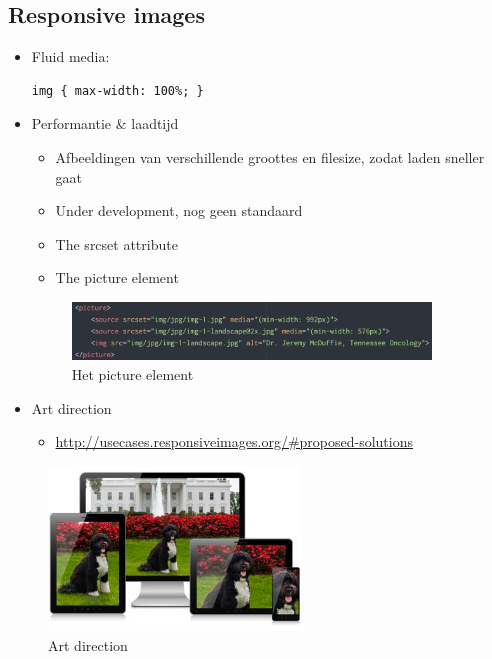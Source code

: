 \documentclass{article}
\begin{document}
\subsection{Responsive images}
\begin{itemize}
    \item Fluid media:
\begin{lstlisting}
img { max-width: 100%; }
\end{lstlisting}
    \item Performantie \& laadtijd
    \begin{itemize}
        \item Afbeeldingen van verschillende groottes en filesize, zodat laden sneller gaat 
        \item Under development, nog geen standaard
        \item The srcset attribute
        \item The picture element
    \end{itemize}
\begin{figure}[H]
    \centering
    \includegraphics[width=0.9\textwidth]{img/picture-element.png}
    \caption{Het picture element}
\end{figure}
    \item Art direction
    \begin{itemize}
        \item \url{http://usecases.responsiveimages.org/#proposed-solutions}
    \end{itemize}
\end{itemize}

\begin{figure}[H]
    \centering
    \includegraphics[width=0.6\textwidth]{img/art-direction.png}
    \caption{Art direction}
\end{figure}
\end{document}
